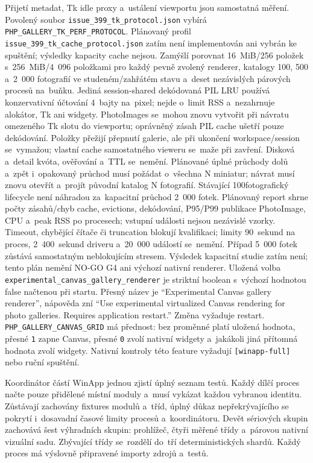 \documentclass[11pt,a4paper]{article}
\newcommand{\codeword}[1]{\nolinkurl{#1}}
\begin{document}
Přijetí metadat, Tk idle proxy a~ustálení
viewportu jsou samostatná měření. Povolený soubor
\codeword{issue_399_tk_protocol.json} vybírá
\codeword{PHP_GALLERY_TK_PERF_PROTOCOL}. Plánovaný profil \codeword{issue_399_tk_cache_protocol.json} zatím není
implementován ani vybrán ke spuštění; výsledky kapacity cache nejsou. Zamýšlí
porovnat 16~MiB/256 položek s~256~MiB/4~096 položkami pro každý pevně zvolený
renderer, katalogy 100, 500 a~2~000 fotografií ve studeném/zahřátém stavu a~deset
nezávislých párových procesů na~buňku. Jediná session-shared dekódovaná PIL LRU
používá konzervativní účtování 4~bajty na~pixel; nejde o~limit RSS a~nezahrnuje
alokátor, Tk ani widgety. PhotoImages se~mohou znovu vytvořit při návratu
omezeného Tk slotu do viewportu; oprávněný zásah PIL cache ušetří pouze
dekódování. Položky přežijí přepnutí galerie, ale při ukončení workspace/session
se~vymažou; vlastní cache samostatného vieweru se~maže při zavření. Disková a~detail
kvóta, ověřování a~TTL se~nemění. Plánované úplné průchody dolů a~zpět i~opakovaný
průchod musí požádat o~všechna N miniatur; návrat musí znovu otevřít a~projít
původní katalog N fotografií. Stávající 100fotografický lifecycle není náhradou
za~kapacitní průchod 2~000 fotek. Plánovaný report shrne počty zásahů/chyb cache,
evictions, dekódování, P95/P99 publikace PhotoImage, CPU a~peak RSS po procesech;
vstupní události nejsou nezávislé vzorky. Timeout, chybějící čítače či truncation
blokují kvalifikaci; limity 90~sekund na proces, 2~400~sekund driveru a~20~000
událostí se~nemění. Případ 5~000 fotek zůstává samostatným neblokujícím stresem.
Výsledek kapacitní studie zatím není; tento plán nemění NO-GO G4 ani výchozí
nativní renderer. Uložená volba
\codeword{experimental_canvas_gallery_renderer} je striktní boolean s~výchozí hodnotou false načtenou při startu. Přesný název je
“Experimental Canvas gallery renderer”, nápověda zní “Use experimental
virtualized Canvas rendering for photo galleries. Requires application
restart.” Změna vyžaduje restart. \codeword{PHP_GALLERY_CANVAS_GRID} má přednost:
bez proměnné platí uložená hodnota, přesné \codeword{1} zapne Canvas, přesné
\codeword{0} zvolí nativní widgety a~jakákoli jiná přítomná hodnota zvolí widgety.
Nativní kontroly této feature vyžadují
\codeword{[winapp-full]} nebo ruční spuštění.

Koordinátor částí WinApp jednou zjistí úplný seznam testů. Každý dílčí proces
načte pouze přidělené místní moduly a~musí vykázat každou vybranou identitu.
Zůstávají zachovány fixtures modulů a~tříd, úplný důkaz nepřekrývajícího se
pokrytí i~dosavadní časové limity procesů a~koordinátoru.
Devět sériových skupin zachovává šest výhradních skupin: prohlížeč, čtyři
měřené třídy a~párovou nativní vizuální sadu. Zbývající třídy se~rozdělí do~tří
deterministických shardů. Každý proces má výslovně připravené
importy zdrojů a~testů.
\end{document}
